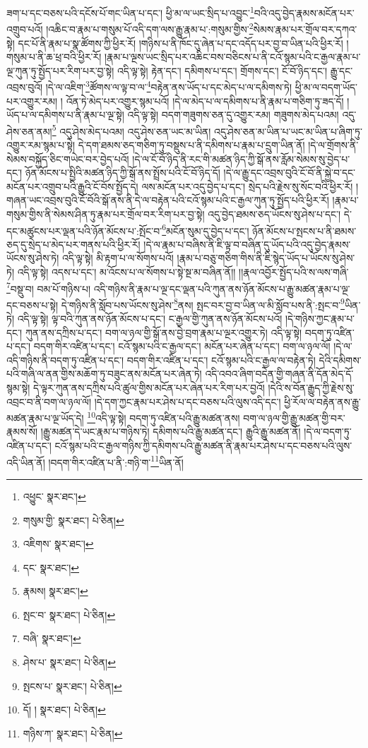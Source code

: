 ཟག་པ་དང་བཅས་པའི་དངོས་པོ་གང་ཡིན་པ་དང་། ཕྱི་མ་ལ་ཡང་སྲིད་པ་འབྱུང་\footnote{འཕྱུང་  སྣར་ཐང་། }བའི་འདུ་བྱེད་རྣམས་མངོན་པར་འགྲུབ་པའོ། །འཆིང་བ་རྣམ་པ་གསུམ་པོ་འདི་དག་ལས་རྒྱུ་རྣམ་པ་:གསུམ་གྱིས་\footnote{གསུམ་གྱི་  སྣར་ཐང་།  པེ་ཅིན། }སེམས་རྣམ་པར་གྲོལ་བར་དཀའ་སྟེ། དང་པོ་ནི་རྣམ་པ་སྣ་ཚོགས་ཀྱི་ཕྱིར་རོ། །གཉིས་པ་ནི་ཁོང་དུ་ཞེན་པ་དང་འདོད་པར་བྱ་བ་ཡིན་པའི་ཕྱིར་རོ། །གསུམ་པ་ནི་ཆ་ཕྲ་བའི་ཕྱིར་རོ། །རྣམ་པ་ལྔས་ཡང་སྲིད་པར་འཆིང་བས་བཅིངས་པ་ནི་ངའོ་སྙམ་པའི་ང་རྒྱལ་རྣམ་པ་ལྔ་ཀུན་ཏུ་སྤྱོད་པར་རིག་པར་བྱ་སྟེ། འདི་ལྟ་སྟེ། རྟེན་དང་། དམིགས་པ་དང་། གྲོགས་དང་། ངོ་བོ་ཉིད་དང་། རྒྱུ་དང་འབྲས་བུའོ། །དེ་ལ་འཇིག་\footnote{འཇིགས་  སྣར་ཐང་། }ཚོགས་ལ་ལྟ་བ་ལ་\footnote{དང་  སྣར་ཐང་། }བརྟེན་ནས་ཡོད་པ་དང་མེད་པ་ལ་དམིགས་ཏེ། ཕྱི་མ་ལ་བདག་ཡོད་པར་འགྱུར་རམ། །
འོན་ཏེ་མེད་པར་འགྱུར་སྙམ་པའོ། །དེ་ལ་མེད་པ་ལ་དམིགས་པ་ནི་རྣམ་པ་གཅིག་ཏུ་ཟད་དོ། །ཡོད་པ་ལ་དམིགས་པ་ནི་རྣམ་པ་ལྔ་སྟེ། འདི་ལྟ་སྟེ། བདག་གཟུགས་ཅན་དུ་འགྱུར་རམ། གཟུགས་མེད་པའམ། འདུ་ཤེས་ཅན་ནམ།\footnote{རྣམས།  སྣར་ཐང་། } འདུ་ཤེས་མེད་པའམ། འདུ་ཤེས་ཅན་ཡང་མ་ཡིན། འདུ་ཤེས་ཅན་མ་ཡིན་པ་ཡང་མ་ཡིན་པ་ཞིག་ཏུ་འགྱུར་རམ་སྙམ་པ་སྟེ། དེ་དག་ཐམས་ཅད་གཅིག་ཏུ་བསྡུས་པ་ནི་དམིགས་པ་རྣམ་པ་དྲུག་ཡིན་ནོ། །དེ་ལ་གྲོགས་ནི་སེམས་བསྐྱོད་ཅིང་གཡེང་བར་བྱེད་པའོ། །དེ་ལ་ངོ་བོ་ཉིད་ནི་རང་གི་མཚན་ཉིད་ཀྱི་སྒོ་ནས་རློམ་སེམས་སུ་བྱེད་པ་དང་། ཉོན་མོངས་པ་སྤྱིའི་མཚན་ཉིད་ཀྱི་སྒོ་ནས་སྤྲོས་པའི་ངོ་བོ་ཉིད་དོ། །དེ་ལ་རྒྱུ་དང་འབྲས་བུའི་ངོ་བོ་ནི་སྐྱེ་བ་དང་མངོན་པར་འགྲུབ་པའི་རྒྱུའི་ངོ་བོས་སྤྱོད་དེ། ལས་མངོན་པར་འདུ་བྱེད་པ་དང་། སྲེད་པའི་རྗེས་སུ་སོང་བའི་ཕྱིར་རོ། །གཞན་ཡང་འབྲས་བུའི་ངོ་བོའི་སྒོ་ནས་ནི་དེ་ལ་བརྟེན་པའི་ངའོ་སྙམ་པའི་ང་རྒྱལ་ཀུན་ཏུ་སྤྱོད་པའི་ཕྱིར་རོ། །རྣམ་པ་གསུམ་གྱིས་ནི་སེམས་ཤིན་ཏུ་རྣམ་པར་གྲོལ་བར་རིག་པར་བྱ་སྟེ། འདུ་བྱེད་ཐམས་ཅད་ཡོངས་སུ་ཤེས་པ་དང་། དེ་དང་མཚུངས་པར་ལྡན་པའི་ཉོན་མོངས་པ་:སྤོང་བ་\footnote{སྤང་བ་  སྣར་ཐང་།  པེ་ཅིན། }མངོན་སུམ་དུ་བྱེད་པ་དང་། ཉོན་མོངས་པ་སྤངས་པ་ནི་ཐམས་ཅད་དུ་སྲེད་པ་མེད་པར་གནས་པའི་ཕྱིར་རོ། །དེ་ལ་རྣམ་པ་བཞིས་ནི་ཇི་ལྟ་བ་བཞིན་དུ་ཡོད་པའི་འདུ་བྱེད་རྣམས་ཡོངས་སུ་ཤེས་ཏེ། འདི་ལྟ་སྟེ། མི་རྟག་པ་ལ་སོགས་པའོ། །རྣམ་པ་བཅུ་གཅིག་གིས་ནི་ཇི་སྙེད་ཡོད་པ་ཡོངས་སུ་ཤེས་ཏེ། འདི་ལྟ་སྟེ། འདས་པ་དང་། མ་འོངས་པ་ལ་སོགས་པ་སྟེ་སྔ་མ་བཞིན་ནོ།། །།རྣལ་འབྱོར་སྤྱོད་པའི་ས་ལས་གཞི་\footnote{བཞི་  སྣར་ཐང་། }བསྡུ་བ། བམ་པོ་གཉིས་པ། འདི་གཉིས་ནི་རྣམ་པ་ལྔ་དང་ལྡན་པའི་ཀུན་ནས་ཉོན་མོངས་པ་རྒྱུ་མཚན་རྣམ་པ་ལྔ་དང་བཅས་པ་སྟེ། དེ་གཉིས་ནི་སློབ་པས་ཡོངས་སུ་ཤེས་\footnote{ཤེས་པ་  སྣར་ཐང་།  པེ་ཅིན། }ནས། སྤང་བར་བྱ་བ་ཡིན་ལ་མི་སློབ་པས་ནི་:སྤང་བ་\footnote{སྤངས་པ་  སྣར་ཐང་།  པེ་ཅིན། }ཡིན་ཏེ། འདི་ལྟ་སྟེ། ལྟ་བའི་ཀུན་ནས་ཉོན་མོངས་པ་དང་། ང་རྒྱལ་གྱི་ཀུན་ནས་ཉོན་མོངས་པའོ། །དེ་གཉིས་ཀྱང་རྣམ་པ་དང་། ཀུན་ནས་དཀྲིས་པ་དང་། བག་ལ་ཉལ་གྱི་སྒོ་ནས་བྱེ་བྲག་རྣམ་པ་ལྔར་འགྱུར་ཏེ། འདི་ལྟ་སྟེ། བདག་ཏུ་འཛིན་པ་དང་། བདག་གིར་འཛིན་པ་དང་། ངའོ་སྙམ་པའི་ང་རྒྱལ་དང་། མངོན་པར་ཞེན་པ་དང་། བག་ལ་ཉལ་ལོ། །དེ་ལ་འདི་གཉིས་ནི་བདག་ཏུ་འཛིན་པ་དང་། བདག་གིར་འཛིན་པ་དང་། ངའོ་སྙམ་པའི་ང་རྒྱལ་ལ་བརྟེན་ཏེ། དེའི་དམིགས་པའི་གཞི་ལ་ནན་གྱིས་མཆོག་ཏུ་བཟུང་ནས་མངོན་པར་ཞེན་ཏེ། འདི་འབའ་ཞིག་བདེན་གྱི་གཞན་ནི་དོན་མེད་དོ་སྙམ་སྟེ། དེ་ལྟར་ཀུན་ནས་དཀྲིས་པའི་ཚུལ་གྱིས་མངོན་པར་ཞེན་པར་རིག་པར་བྱའོ། །དེའི་ས་བོན་རྒྱུད་ཀྱི་རྗེས་སུ་འབྲང་བ་ནི་བག་ལ་ཉལ་ལོ། །དེ་དག་ཀྱང་རྣམ་པར་ཤེས་པ་དང་བཅས་པའི་ལུས་འདི་དང་། ཕྱི་རོལ་ལ་བརྟེན་ནས་རྒྱུ་མཚན་རྣམ་པ་ལྔ་ཡོད་དེ། \footnote{དོ། །   སྣར་ཐང་།  པེ་ཅིན། }འདི་ལྟ་སྟེ། བདག་ཏུ་འཛིན་པའི་རྒྱུ་མཚན་ནས། བག་ལ་ཉལ་གྱི་རྒྱུ་མཚན་གྱི་བར་རྣམས་སོ། །རྒྱུ་མཚན་དེ་ཡང་རྣམ་པ་གཉིས་ཏེ། དམིགས་པའི་རྒྱུ་མཚན་དང་། རྒྱུའི་རྒྱུ་མཚན་ནོ། །དེ་ལ་བདག་ཏུ་འཛིན་པ་དང་། ངའོ་སྙམ་པའི་ང་རྒྱལ་གཉིས་ཀྱི་དམིགས་པའི་རྒྱུ་མཚན་ནི་རྣམ་པར་ཤེས་པ་དང་བཅས་པའི་ལུས་འདི་ཡིན་ནོ། །བདག་གིར་འཛིན་པ་ནི་:གཉི་ག་\footnote{གཉིས་ཀ་  སྣར་ཐང་།  པེ་ཅིན། }ཡིན་ནོ། 